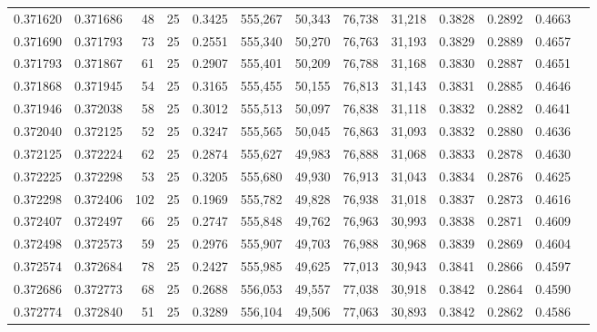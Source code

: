 \begin{tabular}{rrrrrrrrrrrrr}
0.371620 & 0.371686 &    48 &  25 &                                     0.3425 & 555,267 &  50,343 &  76,738 &  31,218 & 0.3828 & 0.2892 & 0.4663 \\
0.371690 & 0.371793 &    73 &  25 &                                     0.2551 & 555,340 &  50,270 &  76,763 &  31,193 & 0.3829 & 0.2889 & 0.4657 \\
0.371793 & 0.371867 &    61 &  25 &                                     0.2907 & 555,401 &  50,209 &  76,788 &  31,168 & 0.3830 & 0.2887 & 0.4651 \\
0.371868 & 0.371945 &    54 &  25 &                                     0.3165 & 555,455 &  50,155 &  76,813 &  31,143 & 0.3831 & 0.2885 & 0.4646 \\
0.371946 & 0.372038 &    58 &  25 &                                     0.3012 & 555,513 &  50,097 &  76,838 &  31,118 & 0.3832 & 0.2882 & 0.4641 \\
0.372040 & 0.372125 &    52 &  25 &                                     0.3247 & 555,565 &  50,045 &  76,863 &  31,093 & 0.3832 & 0.2880 & 0.4636 \\
0.372125 & 0.372224 &    62 &  25 &                                     0.2874 & 555,627 &  49,983 &  76,888 &  31,068 & 0.3833 & 0.2878 & 0.4630 \\
0.372225 & 0.372298 &    53 &  25 &                                     0.3205 & 555,680 &  49,930 &  76,913 &  31,043 & 0.3834 & 0.2876 & 0.4625 \\
0.372298 & 0.372406 &   102 &  25 &                                     0.1969 & 555,782 &  49,828 &  76,938 &  31,018 & 0.3837 & 0.2873 & 0.4616 \\
0.372407 & 0.372497 &    66 &  25 &                                     0.2747 & 555,848 &  49,762 &  76,963 &  30,993 & 0.3838 & 0.2871 & 0.4609 \\
0.372498 & 0.372573 &    59 &  25 &                                     0.2976 & 555,907 &  49,703 &  76,988 &  30,968 & 0.3839 & 0.2869 & 0.4604 \\
0.372574 & 0.372684 &    78 &  25 &                                     0.2427 & 555,985 &  49,625 &  77,013 &  30,943 & 0.3841 & 0.2866 & 0.4597 \\
0.372686 & 0.372773 &    68 &  25 &                                     0.2688 & 556,053 &  49,557 &  77,038 &  30,918 & 0.3842 & 0.2864 & 0.4590 \\
0.372774 & 0.372840 &    51 &  25 &                                     0.3289 & 556,104 &  49,506 &  77,063 &  30,893 & 0.3842 & 0.2862 & 0.4586 \\

\end{tabular}

